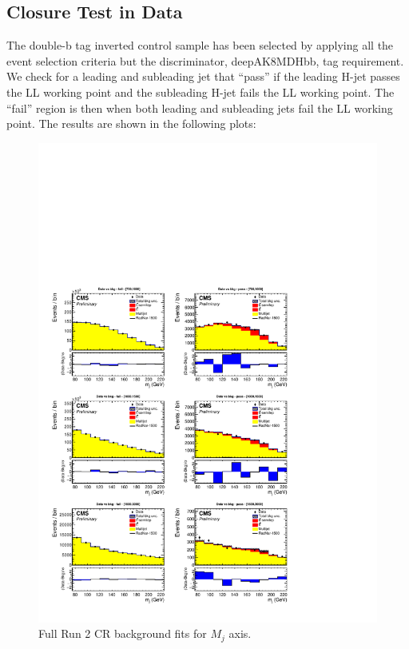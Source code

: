 \subsection{Closure Test in Data\label{ss:BkgValInData}}
The double-b tag inverted control sample has been selected by applying all the event selection criteria but the discriminator, deepAK8MDHbb, tag requirement. We check for a leading and subleading jet that ``pass'' if the leading H-jet passes the LL working point and the subleading H-jet fails the LL working point. The ``fail'' region is then when both leading and subleading jets fail the LL working point. The results are shown in the following plots:
\begin{figure}[!htb]
	\centering
	\includegraphics[width=1\textwidth]{Figures/postfit_projx_fitb_CR.pdf}
	\caption{Full Run 2 CR background fits for $M_j$ axis.}
	\label{fig:18CRmj}
\end{figure}
